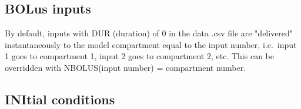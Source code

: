 \documentclass[
]{book}
\newenvironment{Shaded}{\begin{snugshade}}{\end{snugshade}}
\newcommand{\AttributeTok}[1]{\textcolor[rgb]{0.77,0.63,0.00}{#1}}
\newcommand{\DecValTok}[1]{\textcolor[rgb]{0.00,0.00,0.81}{#1}}
\newcommand{\FunctionTok}[1]{\textcolor[rgb]{0.00,0.00,0.00}{#1}}
\newcommand{\NormalTok}[1]{#1}
\newcommand{\OtherTok}[1]{\textcolor[rgb]{0.56,0.35,0.01}{#1}}
\newcommand{\SpecialCharTok}[1]{\textcolor[rgb]{0.00,0.00,0.00}{#1}}
\newcommand{\StringTok}[1]{\textcolor[rgb]{0.31,0.60,0.02}{#1}}
\begin{document}
\begin{Shaded}
\end{Shaded}

\hypertarget{bolR6}{%
\subsection{BOLus inputs}\label{bolR6}}

By default, inputs with DUR (duration) of 0 in the data .csv file are
"delivered" instantaneously to the model compartment equal to the
input number, i.e.~input 1 goes to compartment 1, input 2 goes to
compartment 2, etc. This can be overridden with NBOLUS(input number) =
compartment number.

\begin{Shaded}
\end{Shaded}

\hypertarget{iniR6}{%
\subsection{INItial conditions}\label{iniR6}}
\end{document}
